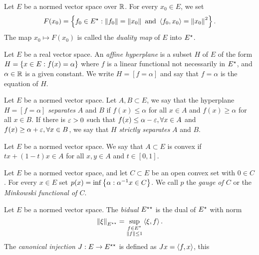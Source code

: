 \documentclass[11pt]{article}
\begin{document}
\begin{definition}
    Let $E$ be a normed vector space over $\mathbb{R}$. For every $x_0\in E$, we set 
    \begin{equation*}
        F(x_0) = \left\{f_0\in E{}^{\star} : \left\lVert f_0\right\rVert = \left\lVert x_0\right\rVert \text{ and } \left\langle f_0, x_0\right\rangle = \left\lVert x_0\right\rVert^2\right\}.
    \end{equation*}
    The map $x_0\mapsto F(x_0)$ is called the \textit{duality map} of $E$ into $E{}^{\star}$.
\end{definition}

\begin{definition}
    Let $E$ be a real vector space. An \textit{affine hyperplane} is a subset $H$ of $E$ of the form $H= \left\{x\in E : f(x) = \alpha\right\}$ where $f$ is a linear functional not necessarily in $E{}^{\star}$, and $\alpha \in \mathbb{R}$ is a given constant.  We write $H=[f=\alpha]$ and say that $f=\alpha$ is the equation of $H$.
\end{definition}

\begin{definition}
    Let $E$ be a normed vector space. Let $A,B\subset E$, we say that the hyperplane $H=[f=\alpha]$ \textit{separates} $A$ and $B$ if $f(x)\leq \alpha$ for all $x\in A$ and $f(x)\geq \alpha$ for all $x\in B$. If there is $\varepsilon>0$ such that $f(x)\leq \alpha-\varepsilon, \forall x\in A$ and $f(x)\geq \alpha+\varepsilon, \forall x\in B$, we say that $H$ \textit{strictly separates} $A$ and $B$.  
\end{definition}

\begin{definition}
    Let $E$ be a normed vector space. We say that $A\subset E$ is convex if $tx +(1-t)x\in A$ for all $x,y\in A$ and $t\in [0,1]$.
\end{definition}

\begin{definition}
    Let $E$ be a normed vector space, and let $C\subset E$ be an open convex set with $0\in C$. For every $x\in E$ set $p(x)= \inf \left\{\alpha : \alpha^{-1}x\in C\right\}$. We call $p$ the \textit{gauge of $C$} or the \textit{Minkowski functional of $C$}.
\end{definition}

\begin{definition}
    Let $E$ be a normed vector space. The \textit{bidual} $E{}^{\star\star}$ is the dual of $E{}^{\star}$ with norm
    \begin{equation*}
        \left\lVert\xi\right\rVert_{E{}^{\star\star}} = \sup_{\substack{f\in E{}^{\star}\\ \left\lVert f\right\rVert \leq 1}} \left\langle\xi, f\right\rangle.
    \end{equation*}
    The \textit{canonical injection} $J:E\to E{}^{\star\star}$ is defined as $Jx = \left\langle f, x\right\rangle$, this 
\end{definition}
\end{document}
